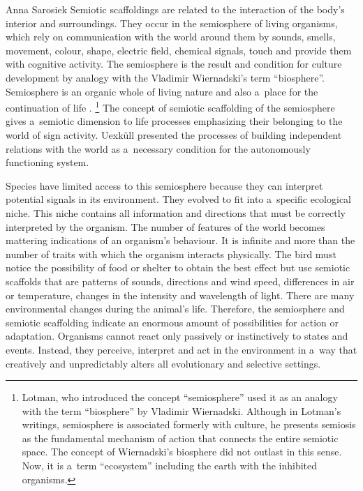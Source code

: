 \begin{artengenv}{Anna Sarosiek}
Semiotic scaffoldings are related to the interaction of the body’s interior and surroundings. They occur in the semiosphere of living organisms, which rely on communication with the world around them by sounds, smells, movement, colour, shape, electric field, chemical signals, touch and provide them with cognitive activity. The semiosphere is the result and condition for culture development by analogy with the Vladimir Wiernadski’s term ``biosphere''. Semiosphere is an organic whole of living nature and also a~place for the continuation of life
\parencite[][pp.12–126]{lotman_universe_1990}.%
\footnote{Lotman, who introduced the concept ``semiosphere'' used it as an analogy with the term ``biosphere'' by Vladimir Wiernadski. Although in Lotman’s writings, semiosphere is associated formerly with culture, he presents semiosis as the fundamental mechanism of action that connects the entire semiotic space. The concept of Wiernadski's biosphere did not outlast in this sense. Now, it is a~term ``ecosystem'' including the earth with the inhibited organisms.} The concept of semiotic scaffolding of the semiosphere gives a~semiotic dimension to life processes emphasizing their belonging to the world of sign activity. Uexküll presented the processes of building independent relations with the world as a~necessary condition for the autonomously functioning system.

Species have limited access to this semiosphere because they can interpret potential signals in its environment. They evolved to fit into a~specific ecological niche. This niche contains all information and directions that must be correctly interpreted by the organism. The number of features of the world becomes mattering indications of an organism’s behaviour. It is infinite and more than the number of traits with which the organism interacts physically. The bird must notice the possibility of food or shelter to obtain the best effect but use semiotic scaffolds that are patterns of sounds, directions and wind speed, differences in air or temperature, changes in the intensity and wavelength of light. There are many environmental changes during the animal’s life. Therefore, the semiosphere and semiotic scaffolding indicate an enormous amount of possibilities for action or adaptation. Organisms cannot react only passively or instinctively to states and events. Instead, they perceive, interpret and act in the environment in a~way that creatively and unpredictably alters all evolutionary and selective settings.


\end{artengenv}
